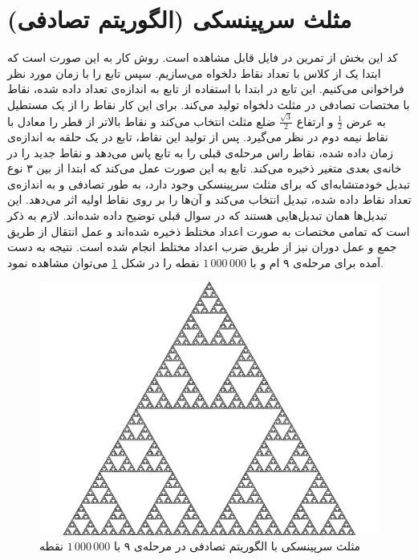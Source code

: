 \documentclass[11pt, a4paper]{article}
\begin{document}
\section{\textbf{مثلث سرپینسکی (الگوریتم تصادفی)}}
کد این بخش از تمرین در فایل
قابل مشاهده است. روش کار به این صورت است که ابتدا یک
از کلاس
با تعداد نقاط دلخواه می‌سازیم. سپس تابع
را با زمان مورد نظر فراخوانی می‌کنیم. این تابع در ابتدا با استفاده از تابع
به اندازه‌ی تعداد داده شده، نقاط با مختصات تصادفی در مثلث دلخواه تولید می‌کند.
برای این کار نقاط را از یک مستطیل به عرض
$\frac{1}{2}$
و ارتفاع
$\frac{\sqrt{3}}{2}$
ضلع مثلث انتخاب می‌کند و نقاط بالاتر از قطر را معادل با نقاط نیمه دوم در نظر می‌گیرد.
پس از تولید این نقاط، تابع
در یک حلقه به اندازه‌ی زمان داده شده، نقاط راس مرحله‌ی قبلی را به تابع
پاس می‌دهد و نقاط جدید را در خانه‌ی بعدی متغیر
ذخیره می‌کند. تابع
به این صورت عمل می‌کند که ابتدا از بین ۳ نوع تبدیل خود‌متشابه‌ای که برای مثلث سرپینسکی وجود دارد،
به طور تصادفی و به اندازه‌ی تعداد نقاط داده شده، تبدیل انتخاب می‌کند و آن‌ها را بر روی نقاط اولیه اثر می‌دهد.
این تبدیل‌ها همان تبدیل‌هایی هستند که در سوال قبلی توضیح داده شده‌اند.
لازم به ذکر است که تمامی مختصات به صورت اعداد مختلط ذخیره شده‌اند
و عمل انتقال از طریق جمع و عمل دوران نیز از طریق ضرب اعداد مختلط انجام شده است.
نتیجه به دست آمده برای مرحله‌ی ۹ ام و با
$1\,000\,000$
نقطه را در شکل
\ref{fig:q3_sierpinski_random}
می‌توان مشاهده نمود.

\begin{figure}[h]
  \centering
  \includegraphics[width=.5\textwidth]{q3_1000000_9.png}
  \caption{مثلث سرپینسکی با الگوریتم تصادفی در مرحله‌ی ۹ با $1\,000\,000$ نقطه}
  \label{fig:q3_sierpinski_random}
\end{figure}
\end{document}
